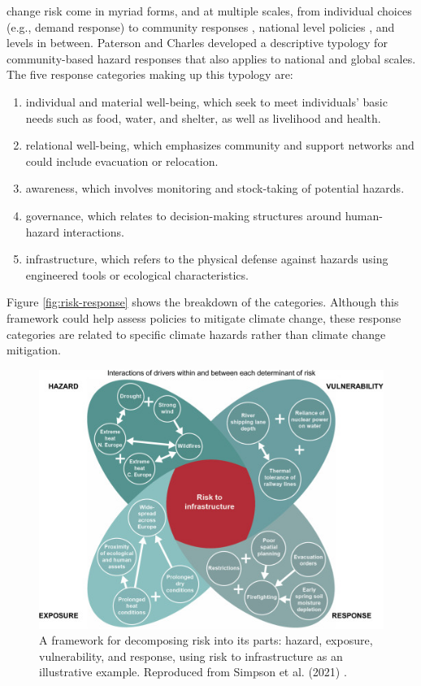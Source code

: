 change risk come in myriad forms,  and at multiple scales, from individual
choices (e.g., demand response) \cite{seck_embedding_2020,rinaldi_what_2022,
dehghanpour_agent-based_2018} to community responses
\cite{paterson_community-based_2019, elmallah_frontlining_2022}, national level
policies \cite{roelfsema_taking_2020, fawzy_strategies_2020}, and levels in
between. Paterson and Charles \cite{paterson_community-based_2019} developed a
descriptive typology for community-based hazard responses that also applies to
national and global scales. The five response categories making up this typology
are:
\cite{paterson_community-based_2019}
\begin{enumerate}
    \item individual and material well-being, which seek to meet individuals'
    basic needs such as food, water, and shelter, as well as livelihood and
    health.
    \item relational well-being, which emphasizes community and support networks
    and could include evacuation or relocation.
    \item awareness, which involves monitoring and stock-taking of potential
    hazards.
    \item governance, which relates to decision-making structures around
    human-hazard interactions.
    \item infrastructure, which refers to the physical defense against hazards
    using engineered tools or ecological characteristics.
\end{enumerate} 
Figure \ref{fig:risk-response} shows the breakdown of the categories. Although
this framework could help assess policies to mitigate climate change, these
response categories are related to specific climate hazards rather than climate
change mitigation.


\begin{figure}
    \centering
    \includegraphics{figures/02_literature_review/simpson-risk-framework.jpg}
    \caption{A framework for decomposing risk into its parts: hazard, exposure,
    vulnerability, and response, using risk to infrastructure as an illustrative
    example. Reproduced from Simpson et al. (2021)
    \cite{simpson_framework_2021}.}
    \label{fig:risk-framework}
\end{figure}

